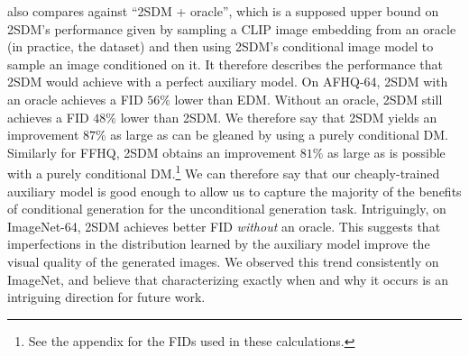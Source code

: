 
 also compares against ``2SDM + oracle'', which is a supposed upper bound on 2SDM's performance given by sampling a CLIP image embedding from an oracle (in practice, the dataset) and then using 2SDM's conditional image model to sample an image conditioned on it. It therefore describes the performance that 2SDM would achieve with a perfect auxiliary model. On AFHQ-64, 2SDM with an oracle achieves a FID $56\%$ lower than EDM. Without an oracle, 2SDM still achieves a FID $48\%$ lower than 2SDM. We therefore say that 2SDM yields an improvement $87\%$ as large as can be gleaned by using a purely conditional DM. Similarly for FFHQ, 2SDM obtains an improvement $81\%$ as large as is possible with a purely conditional DM.\footnote{See the appendix for the FIDs used in these calculations.} We can therefore say that our cheaply-trained auxiliary model is good enough to allow us to capture the majority of the benefits of conditional generation for the unconditional generation task. Intriguingly,
 on ImageNet-64, 2SDM achieves better FID \textit{without} an oracle. This suggests that imperfections in the distribution
learned by the auxiliary model improve the visual quality of the generated images. We observed this trend consistently on ImageNet, and believe that characterizing exactly when and why it occurs is an intriguing direction for future work.


